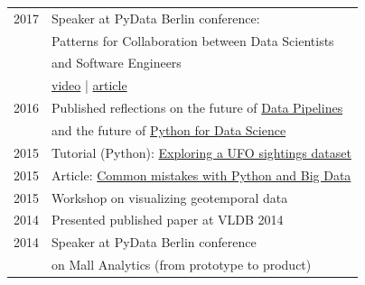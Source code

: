 \documentclass[10pt]{article} %
\begin{document}
\begin{minipage}[t]{0.44\textwidth}
\begin{tabular}{rl}
\textsc{2017}
& Speaker at PyData Berlin conference:\\
& Patterns for Collaboration between Data Scientists\\
& and Software Engineers \\
& \href{https://www.youtube.com/watch?v=7oxC7cbRYyE}{video} | \href{https://www.codementor.io/blog/data-scientists-collab-5ah55wy1ro}{article} \\
\textsc{2016}
& Published reflections on the future of \href{http://www.datasciencecentral.com/profiles/blogs/interview-with-karolina-alexiou-building-data-pipelines}{Data Pipelines}\\
& and the future of \href{https://blog.propulsionacademy.com/why-python-for-data-science-is-the-future-b556de75c80c#.mdh3ztapq}{Python for Data Science}\\
\textsc{2015}
    & Tutorial (Python): \href{https://www.airpair.com/python/posts/using-python-and-qgis-for-geospatial-visualization}{Exploring a UFO sightings dataset}\\
\textsc{2015}
& Article: \href{https://www.airpair.com/python/posts/top-mistakes-python-big-data-analytics}{Common mistakes with Python and Big Data}\\
\textsc{2015}
& Workshop on visualizing geotemporal data\\
\textsc{2014}
& Presented published paper at VLDB 2014\\
\textsc{2014}
& Speaker at PyData Berlin conference \\
& on Mall Analytics (from prototype to product) \\ 





\end{tabular}\\[10pt]

	
\end{minipage} %
\end{document}

